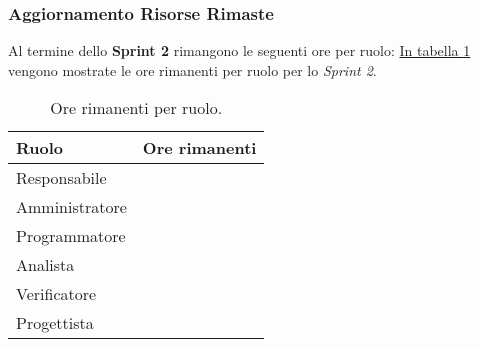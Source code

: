\subsubsection{Aggiornamento Risorse Rimaste}
Al termine dello \textbf{Sprint 2} rimangono le seguenti ore per ruolo: \hyperref[tab:sprint2_ore_rimanenti]{In tabella \ref{tab:sprint2_ore_rimanenti}} vengono mostrate le ore rimanenti per ruolo per lo \textit{Sprint 2}.

\begin{table}[!h]
    \centering
    \begin{tabular}{| l | l |}
    \hline
    \textbf{Ruolo} & 
    \textbf{Ore rimanenti}\\
    \hline
        Responsabile & \\
    \hline
        Amministratore & \\
    \hline
        Programmatore & \\
    \hline
        Analista & \\
    \hline
        Verificatore & \\
    \hline
        Progettista & \\
    \hline
    \end{tabular}
    \caption{Ore rimanenti per ruolo.}
    \label{tab:sprint2_ore_rimanenti} 
\end{table}
